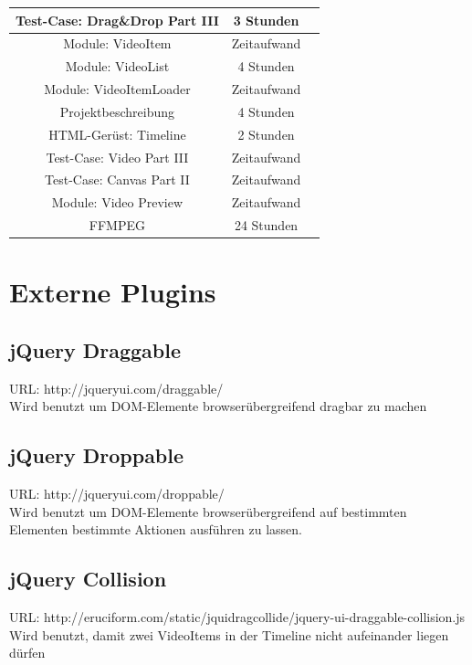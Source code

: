 \documentclass[a4paper,10pt]{scrartcl}
\begin{document}
\begin{tabular}{|c|c|c|}
	Test-Case: Drag\&Drop Part III & 3 Stunden \\ \hline
	
	Module: VideoItem & Zeitaufwand \\ \hline
	
	Module: VideoList & 4 Stunden \\ \hline
			
	Module: VideoItemLoader & Zeitaufwand \\ \hline
		
	Projektbeschreibung & 4 Stunden \\ \hline
	
	HTML-Gerüst: Timeline & 2 Stunden \\ \hline
	
	Test-Case: Video Part III & Zeitaufwand \\ \hline
	
	Test-Case: Canvas Part II & Zeitaufwand \\ \hline
	
	Module: Video Preview & Zeitaufwand \\ \hline
	
	FFMPEG & 24 Stunden \\ \hline
 \end{tabular}
 \newpage
\section{Externe Plugins}
\subsection{jQuery Draggable}
URL: http://jqueryui.com/draggable/\\
Wird benutzt um DOM-Elemente browserübergreifend dragbar zu machen
\subsection{jQuery Droppable}
URL: http://jqueryui.com/droppable/\\
Wird benutzt um DOM-Elemente browserübergreifend auf bestimmten Elementen bestimmte Aktionen ausführen zu lassen.
\subsection{jQuery Collision}
URL: http://eruciform.com/static/jquidragcollide/jquery-ui-draggable-collision.js\\
Wird benutzt, damit zwei VideoItems in der Timeline nicht aufeinander liegen dürfen
\end{document}
